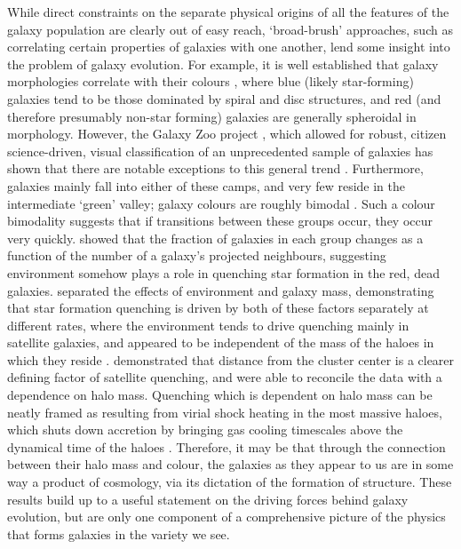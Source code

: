While direct constraints on the separate physical origins of all the features of the galaxy population are clearly out of easy reach, `broad-brush' approaches, such as correlating certain properties of galaxies with one another, lend some insight into the problem of galaxy evolution. For example, it is well established that galaxy morphologies correlate with their colours \citep[e.g.][]{2001AJ....122.1861S}, where blue (likely star-forming) galaxies tend to be those dominated by spiral and disc structures, and red (and therefore presumably non-star forming) galaxies are generally spheroidal in morphology. However, the Galaxy Zoo project \citep{2008MNRAS.389.1179L,2011MNRAS.410..166L}, which allowed for robust, citizen science-driven, visual classification of an unprecedented sample of galaxies has shown that there are notable exceptions to this general trend \citep[e.g.][]{2009MNRAS.396..818S,2010MNRAS.405..783M}. Furthermore, galaxies mainly fall into either of these camps, and very few reside in the intermediate `green' valley; galaxy colours are roughly bimodal \citep[e.g.][]{2004ApJ...600..681B,2006MNRAS.373..469B}. Such a colour bimodality suggests that if transitions between these groups occur, they occur very quickly. \citet{2006MNRAS.373..469B} showed that the fraction of galaxies in each group changes as a function of the number of a galaxy's projected neighbours, suggesting environment somehow plays a role in quenching star formation in the red, dead galaxies. \citet{2010ApJ...721..193P} separated the effects of environment and galaxy mass, demonstrating that star formation quenching is driven by both of these factors separately at different rates, where the environment tends to drive quenching mainly in satellite galaxies, and appeared to be independent of the mass of the haloes in which they reside \citep{2012ApJ...757....4P}. \citet{2013MNRAS.428.3306W} demonstrated that distance from the cluster center is a clearer defining factor of satellite quenching, and were able to reconcile the data with a dependence on halo mass. Quenching which is dependent on halo mass can be neatly framed as resulting from virial shock heating in the most massive haloes, which shuts down accretion by bringing gas cooling timescales above the dynamical time of the haloes \citep[e.g.][]{2006MNRAS.368....2D,2015MNRAS.447..374G}. Therefore, it may be that through the connection between their halo mass and colour, the galaxies as they appear to us are in some way a product of cosmology, via its dictation of the formation of structure. These results build up to a useful statement on the driving forces behind galaxy evolution, but are only one component of a comprehensive picture of the physics that forms galaxies in the variety we see.

